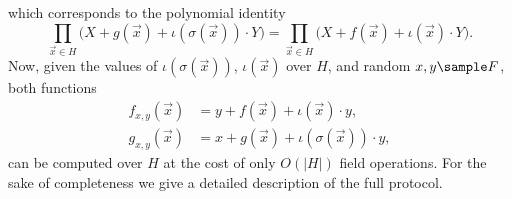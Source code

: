 \documentclass[11pt]{article}
\theoremstyle{definition}
\theoremstyle{remark}
\begin{document}
which corresponds to the polynomial identity
\begin{equation*}
\prod_{\vec x\in H} \Big(X + g(\vec x) +\iota(\sigma(\vec x))\cdot Y\Big) = \prod_{\vec x\in H}  \Big(X + f(\vec x) + \iota(\vec x) \cdot Y \Big).
\end{equation*}
Now, given the values of $\iota(\sigma(\vec x))$, $\iota(\vec x)$ over $H$,  and random $x, y\sample F$, both functions 
\begin{align}
\label{e:fxy}
f_{x,y}(\vec x) &= y + f(\vec x) + \iota(\vec x) \cdot y,
\\
\label{e:gxy}
g_{x,y}(\vec x) &= x + g(\vec x) +\iota(\sigma(\vec x))\cdot y,
\end{align}
can be computed over $H$ at the cost of only $O(|H|)$ field operations.
For the sake of completeness we give a detailed description of the full protocol.
\end{document}
